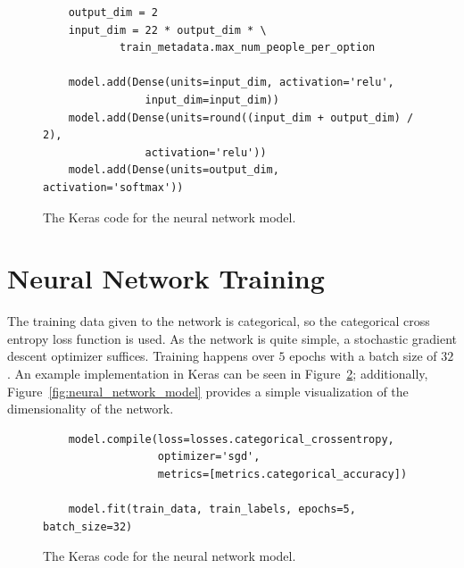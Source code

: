 \documentclass[paper=a4paper]{report}
\begin{document}
\begin{figure}[h]
    \centering
    \begin{verbatim}
    output_dim = 2
    input_dim = 22 * output_dim * \
            train_metadata.max_num_people_per_option

    model.add(Dense(units=input_dim, activation='relu',
                input_dim=input_dim))
    model.add(Dense(units=round((input_dim + output_dim) / 2),
                activation='relu'))
    model.add(Dense(units=output_dim, activation='softmax'))
    \end{verbatim}
    \caption{The Keras code for the neural network model.}
    \label{fig:code_for_model}
\end{figure}

\FloatBarrier
\section{Neural Network Training}

The training data given to the network is categorical, so the categorical cross entropy loss
function is used. As the network is quite simple, a stochastic gradient descent optimizer suffices.
Training happens over $5$ epochs with a batch size of $32$. An example implementation in Keras can
be seen in Figure~\ref{fig:code_for_training}; additionally, Figure~\ref{fig:neural_network_model}
provides a simple visualization of the dimensionality of the network.

\begin{figure}[h]
    \centering
    \begin{verbatim}
    model.compile(loss=losses.categorical_crossentropy,
                  optimizer='sgd',
                  metrics=[metrics.categorical_accuracy])
    
    model.fit(train_data, train_labels, epochs=5, batch_size=32)
    \end{verbatim}
    \caption{The Keras code for the neural network model.}
    \label{fig:code_for_training}
\end{figure}
\end{document}
